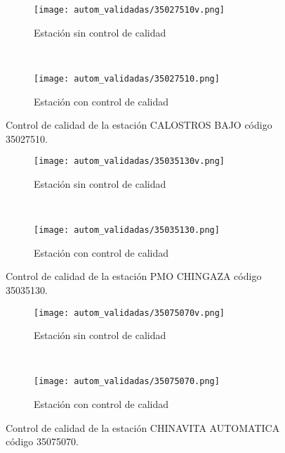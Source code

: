 \begin{figure}[H]
\begin{subfigure}[b]{0.5\textwidth}
\begin{center}
\texttt{[image: autom\_validadas/35027510v.png]}
\caption{Estación sin control de calidad}
        \end{center}
\end{subfigure}
~
\begin{subfigure}[b]{0.5\textwidth}
\begin{center}
\texttt{[image: autom\_validadas/35027510.png]}
\caption{Estación con control de calidad}
\end{center}    
\end{subfigure}
\caption{Control de calidad de la estación CALOSTROS BAJO código 35027510.}
\end{figure}    
  
\begin{figure}[H]
\begin{subfigure}[b]{0.5\textwidth}
\begin{center}
\texttt{[image: autom\_validadas/35035130v.png]}
\caption{Estación sin control de calidad}
        \end{center}
\end{subfigure}
~
\begin{subfigure}[b]{0.5\textwidth}
\begin{center}
\texttt{[image: autom\_validadas/35035130.png]}
\caption{Estación con control de calidad}
\end{center}    
\end{subfigure}
\caption{Control de calidad de la estación PMO CHINGAZA código 35035130.}
\end{figure}    
  
\begin{figure}[H]
\begin{subfigure}[b]{0.5\textwidth}
\begin{center}
\texttt{[image: autom\_validadas/35075070v.png]}
\caption{Estación sin control de calidad}
        \end{center}
\end{subfigure}
~
\begin{subfigure}[b]{0.5\textwidth}
\begin{center}
\texttt{[image: autom\_validadas/35075070.png]}
\caption{Estación con control de calidad}
\end{center}    
\end{subfigure}
\caption{Control de calidad de la estación CHINAVITA AUTOMATICA código 35075070.}
\end{figure}    
  
